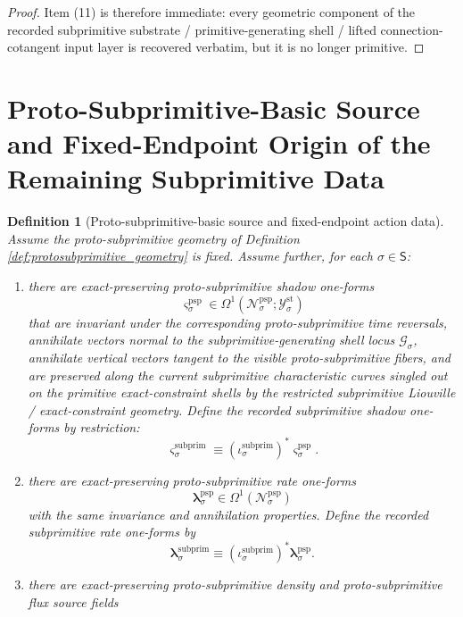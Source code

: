 \documentclass[11pt]{article}
\newcommand{\SectorSet}{\mathsf S}
\newcommand{\StatTagClass}[1]{\mathcal Y_{#1}^{\mathrm{st}}}
\newcommand{\SubprimSpace}[1]{\mathcal G_{#1}}
\newcommand{\SubprimInc}[1]{\iota_{#1}^{\mathrm{subprim}}}
\newcommand{\SubprimShadowForm}[1]{\boldsymbol{\varsigma}_{#1}^{\mathrm{subprim}}}
\newcommand{\SubprimRateForm}[1]{\boldsymbol{\lambda}_{#1}^{\mathrm{subprim}}}
\newcommand{\ProtoSubprimSpace}[1]{\mathcal N_{#1}^{\mathrm{psp}}}
\newcommand{\ProtoSubprimShadowForm}[1]{\boldsymbol{\varsigma}_{#1}^{\mathrm{psp}}}
\newcommand{\ProtoSubprimRateForm}[1]{\boldsymbol{\lambda}_{#1}^{\mathrm{psp}}}
\newtheorem{definition}{Definition}
\begin{document}
\begin{proof}
Item (11) is therefore immediate: every geometric component of the recorded subprimitive substrate / primitive-generating shell / lifted connection-cotangent input layer is recovered verbatim, but it is no longer primitive.
\end{proof}

\section{Proto-Subprimitive-Basic Source and Fixed-Endpoint Origin of the Remaining Subprimitive Data}

\begin{definition}[Proto-subprimitive-basic source and fixed-endpoint action data]
\label{def:protosubprimitive_basic}
Assume the proto-subprimitive geometry of Definition \ref{def:protosubprimitive_geometry} is fixed. Assume further, for each \(\sigma\in\SectorSet\):
\begin{enumerate}
    \item there are exact-preserving proto-subprimitive shadow one-forms
    \[
    \ProtoSubprimShadowForm{\sigma}\in\Omega^1(\ProtoSubprimSpace{\sigma};\StatTagClass{\sigma})
    \]
    that are invariant under the corresponding proto-subprimitive time reversals, annihilate vectors normal to the subprimitive-generating shell locus \(\SubprimSpace{\sigma}\), annihilate vertical vectors tangent to the visible proto-subprimitive fibers, and are preserved along the current subprimitive characteristic curves singled out on the primitive exact-constraint shells by the restricted subprimitive Liouville / exact-constraint geometry. Define the recorded subprimitive shadow one-forms by restriction:
    \begin{equation}
    \SubprimShadowForm{\sigma}\equiv (\SubprimInc{\sigma})^*\ProtoSubprimShadowForm{\sigma}.
    \label{eq:subprimitive_shadow_from_protosubprimitive}
    \end{equation}
    \item there are exact-preserving proto-subprimitive rate one-forms
    \[
    \ProtoSubprimRateForm{\sigma}\in\Omega^1(\ProtoSubprimSpace{\sigma})
    \]
    with the same invariance and annihilation properties. Define the recorded subprimitive rate one-forms by
    \begin{equation}
    \SubprimRateForm{\sigma}\equiv (\SubprimInc{\sigma})^*\ProtoSubprimRateForm{\sigma}.
    \label{eq:subprimitive_rate_from_protosubprimitive}
    \end{equation}
    \item there are exact-preserving proto-subprimitive density and proto-subprimitive flux source fields

\end{enumerate}
\end{definition}
\end{document}
